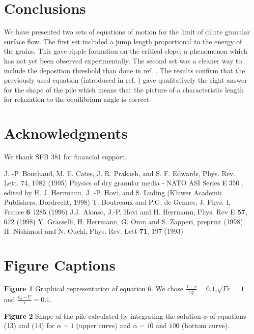 \section{Conclusions}
We have presented two sets of equations of motion for the limit
of dilute granular surface flow. The first set included a jump length 
proportional to the energy of the grains. This gave ripple
formation on the critical slope, a phenomenon which has not yet 
been observed experimentally. The second set was a cleaner way to
include the deposition threshold than done in ref. \cite{Grasselli_98}.
The results confirm that the previously used equation 
(introduced in ref. \cite{Grasselli_98}) 
gave qualitatively the right answer for the shape of the pile
which means that the picture of a characteristic length
for relaxation to the equilibrium angle is correct.

\section*{Acknowledgments}
We thank SFB 381 for financial support.

\begin{thebibliography}{99}

 J. -P. Bouchaud, M. E. Cates, J. R. Prakash, and S. F. Edwards, Phys. Rev. Lett. 74, 1982 (1995)
 Physics of dry granular media - NATO ASI Series E 350 , edited by H. J. Herrmann, J. -P. Hovi, and S. Luding (Kluwer Academic Publishers, Dordrecht, 1998)
 T. Boutreaux and P.G. de Gennes, J. Phys. I, France {\bf 6} 1285 (1996)
 J.J. Alonso, J.-P. Hovi and H. Herrmann, Phys. Rev E
{\bf 57}, 672 (1998)
 Y. Grasselli, H. Herrmann, G. Oron and S. Zapperi,
preprint (1998)
 H. Nishimori and N. Ouchi, Phys. Rev. Lett {\bf 71}, 197 (1993)

\end{thebibliography}

\newpage

\section*{Figure Captions}

\hspace{0.5cm} {\bf Figure 1} Graphical representation of equation
6. We chose $\frac{1-r}{rq}=0.1$,$\sqrt{\Gamma r}=1$ and $\frac{e_o-U}{r}=0.1$.
 
{\bf Figure 2} Shape of the pile calculated by integrating the solution
$\phi$ of equations (13) and (14) for $\alpha=1$ (upper curve) and
$\alpha=10$ and $100$ (bottom curve).

